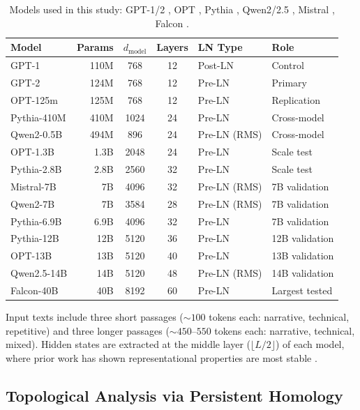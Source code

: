 \documentclass[11pt,a4paper]{article}
\begin{document}
\begin{table}[h]
\centering
\caption{Models used in this study: GPT-1/2 \citep{radford2018improving,radford2019language}, OPT \citep{zhang2022opt}, Pythia \citep{biderman2023pythia}, Qwen2/2.5 \citep{yang2024qwen2}, Mistral \citep{jiang2023mistral}, Falcon \citep{almazrouei2023falcon}.}
\label{tab:models}
\begin{tabular}{lrccll}
\toprule
Model & Params & $d_\text{model}$ & Layers & LN Type & Role \\
\midrule
GPT-1     & 110M  & 768  & 12 & Post-LN & Control \\
GPT-2     & 124M  & 768  & 12 & Pre-LN  & Primary \\
OPT-125m  & 125M  & 768  & 12 & Pre-LN  & Replication \\
Pythia-410M & 410M & 1024 & 24 & Pre-LN & Cross-model \\
Qwen2-0.5B & 494M & 896  & 24 & Pre-LN (RMS) & Cross-model \\
OPT-1.3B  & 1.3B  & 2048 & 24 & Pre-LN  & Scale test \\
Pythia-2.8B & 2.8B & 2560 & 32 & Pre-LN & Scale test \\
\midrule
Mistral-7B & 7B & 4096 & 32 & Pre-LN (RMS) & 7B validation \\
Qwen2-7B & 7B & 3584 & 28 & Pre-LN (RMS) & 7B validation \\
Pythia-6.9B & 6.9B & 4096 & 32 & Pre-LN & 7B validation \\
Pythia-12B & 12B & 5120 & 36 & Pre-LN & 12B validation \\
OPT-13B & 13B & 5120 & 40 & Pre-LN & 13B validation \\
Qwen2.5-14B & 14B & 5120 & 48 & Pre-LN (RMS) & 14B validation \\
Falcon-40B & 40B & 8192 & 60 & Pre-LN & Largest tested \\
\bottomrule
\end{tabular}
\end{table}

Input texts include three short passages (${\sim}100$ tokens each: narrative, technical, repetitive) and three longer passages (${\sim}450$--$550$ tokens each: narrative, technical, mixed). Hidden states are extracted at the middle layer ($\lfloor L/2 \rfloor$) of each model, where prior work has shown representational properties are most stable \citep{ethayarajh2019contextual}.

\subsection{Topological Analysis via Persistent Homology}
\end{document}
